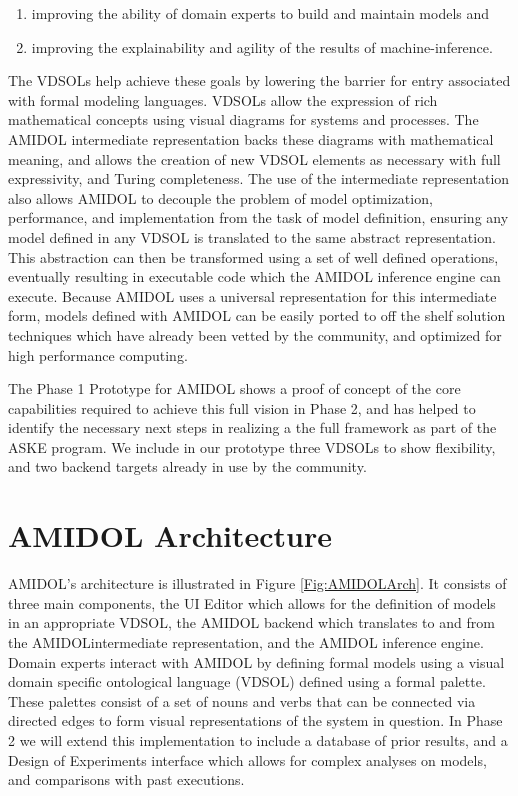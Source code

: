 \documentclass[11pt]{article}
\newcommand{\amidol}{\textsc{AMIDOL}}
\begin{document}
\begin{enumerate}
\item improving the ability of domain experts to build and maintain models and
\item improving the explainability and agility of the results of machine-inference.
\end{enumerate}

The VDSOLs help achieve these goals by lowering the barrier for entry associated with formal modeling languages.  VDSOLs allow the expression of rich mathematical concepts using visual diagrams for systems and processes.  The \amidol{} intermediate representation backs these diagrams with mathematical meaning, and allows the creation of new VDSOL elements as necessary with full expressivity, and Turing completeness.  The use of the intermediate representation also allows \amidol{} to decouple the problem of model optimization, performance, and implementation from the task of model definition, ensuring any model defined in any VDSOL is translated to the same abstract representation.  This abstraction can then be transformed using a set of well defined operations, eventually resulting in executable code which the \amidol{} inference engine can execute.  Because \amidol{} uses a universal representation for this intermediate form, models defined with \amidol{} can be easily ported to off the shelf solution techniques which have already been vetted by the community, and optimized for high performance computing.

The Phase 1 Prototype for \amidol{} shows a proof of concept of the core capabilities required to achieve this full vision in Phase 2, and has helped to identify the necessary next steps in realizing a the full framework as part of the ASKE program.  We include in our prototype three VDSOLs to show flexibility, and two backend targets already in use by the community.

\section{\amidol{} Architecture}

\amidol{}'s architecture is illustrated in Figure \ref{Fig:AMIDOLArch}.  It consists of three main components, the UI Editor which allows for the definition of models in an appropriate VDSOL, the \amidol{} backend which translates to and from the \amidol intermediate representation, and the \amidol{} inference engine.  Domain experts interact with \amidol{} by defining formal models using a visual domain specific ontological language (VDSOL) defined using a formal palette.  These palettes consist of a set of nouns and verbs that can be connected via directed edges to form visual representations of the system in question.  In Phase 2 we will extend this implementation to include a database of prior results, and a Design of Experiments interface which allows for complex analyses on models, and comparisons with past executions.
\end{document}
